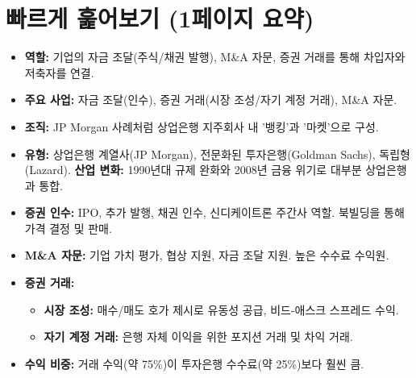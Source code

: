 \documentclass[11pt,a4paper]{book}
\theoremstyle{definition}
\begin{document}
\section{빠르게 훑어보기 (1페이지 요약)}

\begin{tcolorbox}[title={\textbf{투자은행의 역할과 조직}}]
\begin{itemize}
    \item \textbf{역할:} 기업의 자금 조달(주식/채권 발행), M\&A 자문, 증권 거래를 통해 차입자와 저축자를 연결.
    \item \textbf{주요 사업:} 자금 조달(인수), 증권 거래(시장 조성/자기 계정 거래), M\&A 자문.
    \item \textbf{조직:} JP Morgan 사례처럼 상업은행 지주회사 내 '뱅킹'과 '마켓'으로 구성.
    \item \textbf{유형:} 상업은행 계열사(JP Morgan), 전문화된 투자은행(Goldman Sachs), 독립형(Lazard).
    \textbf{산업 변화:} 1990년대 규제 완화와 2008년 금융 위기로 대부분 상업은행과 통합.
\end{itemize}
\end{tcolorbox}

\begin{tcolorbox}[title={\textbf{투자은행 활동의 세부 사항}}]
\begin{itemize}
    \item \textbf{증권 인수:} IPO, 추가 발행, 채권 인수, 신디케이트론 주간사 역할. 북빌딩을 통해 가격 결정 및 판매.
    \item \textbf{M\&A 자문:} 기업 가치 평가, 협상 지원, 자금 조달 지원. 높은 수수료 수익원.
    \item \textbf{증권 거래:}
    \begin{itemize}
        \item \textbf{시장 조성:} 매수/매도 호가 제시로 유동성 공급, 비드-애스크 스프레드 수익.
        \item \textbf{자기 계정 거래:} 은행 자체 이익을 위한 포지션 거래 및 차익 거래.
    \end{itemize}
    \item \textbf{수익 비중:} 거래 수익(약 75\%)이 투자은행 수수료(약 25\%)보다 훨씬 큼.
\end{itemize}
\end{tcolorbox}
\end{document}
